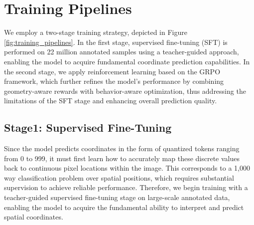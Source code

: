 \section{Training Pipelines}
We employ a two-stage training strategy, depicted in Figure \ref{fig:training_pipelines}. In the first stage, supervised fine-tuning (SFT) is performed on 22 million annotated samples using a teacher-guided approach, enabling the model to acquire fundamental coordinate prediction capabilities. In the second stage, we apply reinforcement learning based on the GRPO framework, which further refines the model's performance by combining geometry-aware rewards with behavior-aware optimization, thus addressing the limitations of the SFT stage and enhancing overall prediction quality.

\subsection{Stage1: Supervised Fine-Tuning}
Since the model predicts coordinates in the form of quantized tokens ranging from 0 to 999, it must first learn how to accurately map these discrete values back to continuous pixel locations within the image. This corresponds to a 1,000 way classification problem over spatial positions, which requires substantial supervision to achieve reliable performance. Therefore, we begin training with a teacher-guided supervised fine-tuning stage on large-scale annotated data, enabling the model to acquire the fundamental ability to interpret and predict spatial coordinates.

